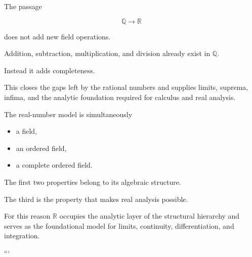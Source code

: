 \begin{remark*}[Interpretation]

The passage

\[
\mathbb Q
\longrightarrow
\mathbb R
\]

does not add new field operations.

Addition, subtraction, multiplication, and division already exist in
$\mathbb Q$.

Instead it adds completeness.

This closes the gaps left by the rational numbers and supplies limits,
suprema, infima, and the analytic foundation required for calculus and
real analysis.

\end{remark*}


\begin{remark*}

The real-number model is simultaneously

\begin{itemize}
    \item a field,
    \item an ordered field,
    \item a complete ordered field.
\end{itemize}

The first two properties belong to its algebraic structure.

The third is the property that makes real analysis possible.

For this reason $\mathbb R$ occupies the analytic layer of the structural
hierarchy and serves as the foundational model for limits, continuity,
differentiation, and integration.

\end{remark*}
```
